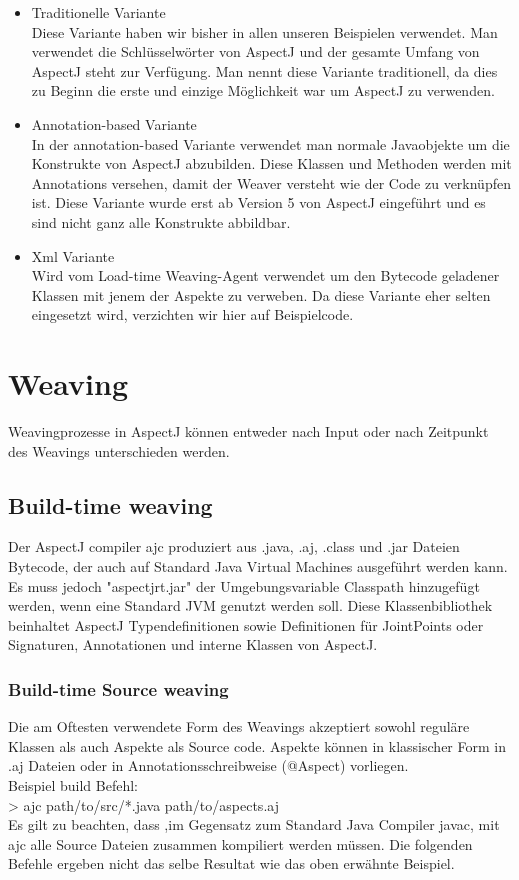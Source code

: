 \begin{itemize}
\item Traditionelle Variante \\
Diese Variante haben wir bisher in allen unseren Beispielen verwendet. Man verwendet die Schlüsselwörter von AspectJ und der gesamte Umfang von AspectJ steht zur Verfügung. Man nennt diese Variante traditionell, da dies zu Beginn die erste und einzige Möglichkeit war um AspectJ zu verwenden.
\item Annotation-based Variante \\
In der annotation-based Variante verwendet man normale Javaobjekte um die Konstrukte von AspectJ abzubilden. Diese Klassen und Methoden werden mit Annotations versehen, damit der Weaver versteht wie der Code zu verknüpfen ist. Diese Variante wurde erst ab Version 5 von AspectJ eingeführt und es sind nicht ganz alle Konstrukte abbildbar.
\item Xml Variante\\
Wird vom Load-time Weaving-Agent verwendet um den Bytecode geladener Klassen mit jenem der Aspekte zu verweben. Da diese Variante eher selten eingesetzt wird, verzichten wir hier auf Beispielcode.
\end{itemize}



\section{Weaving}
Weavingprozesse in AspectJ können entweder nach Input oder nach Zeitpunkt des Weavings unterschieden werden.

\subsection{Build-time weaving}
Der AspectJ compiler ajc produziert aus .java, .aj, .class und .jar Dateien Bytecode, der auch auf Standard Java Virtual Machines ausgeführt werden kann. Es muss jedoch "aspectjrt.jar" der Umgebungsvariable Classpath hinzugefügt werden, wenn eine Standard JVM genutzt werden soll. Diese Klassenbibliothek beinhaltet AspectJ Typendefinitionen sowie Definitionen für JointPoints oder Signaturen, Annotationen und interne Klassen von AspectJ.
\subsubsection*{Build-time Source weaving}
Die am Oftesten verwendete Form des Weavings akzeptiert sowohl reguläre Klassen als auch Aspekte als Source code. Aspekte können in klassischer Form in .aj Dateien oder in Annotationsschreibweise (@Aspect) vorliegen.\\
Beispiel build Befehl:\\
> ajc path/to/src/*.java path/to/aspects.aj\\
Es gilt zu beachten, dass ,im Gegensatz zum Standard Java Compiler javac, mit ajc alle Source Dateien zusammen kompiliert werden müssen. Die folgenden Befehle ergeben nicht das selbe Resultat wie das oben erwähnte Beispiel.\\


